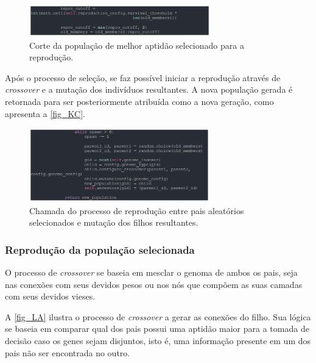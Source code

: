 \begin{figure}[htb]
        \centering
        \caption{\label{fig_KB}Corte da população de melhor aptidão selecionado para a reprodução.}
        \includegraphics[width=0.7\textwidth]{images/KB.png}
\end{figure}

Após o processo de seleção, se faz possível iniciar a reprodução através de \textit{crossover} e a mutação dos
indivíduos resultantes. A nova população gerada é retornada para ser posteriormente atribuída como a nova geração,
como apresenta a \autoref{fig_KC}.

\begin{figure}[htb]
        \centering
        \caption{\label{fig_KC}Chamada do processo de reprodução entre pais aleatórios selecionados e mutação dos filhos resultantes.}
        \includegraphics[width=0.7\textwidth]{images/KC.png}
\end{figure}

\subsubsection{Reprodução da população selecionada}

O processo de \textit{crossover} se baseia em mesclar o genoma de ambos os pais,
seja nas conexões com seus devidos pesos ou nos nós que compõem as suas camadas com seus devidos vieses.

A \autoref{fig_LA} ilustra o processo de \textit{crossover} a gerar as conexões do filho.
Sua lógica se baseia em comparar qual dos pais possui uma aptidão maior para a tomada de
decisão caso os genes sejam disjuntos, isto é, uma informação presente em um dos pais não ser encontrada no outro.

